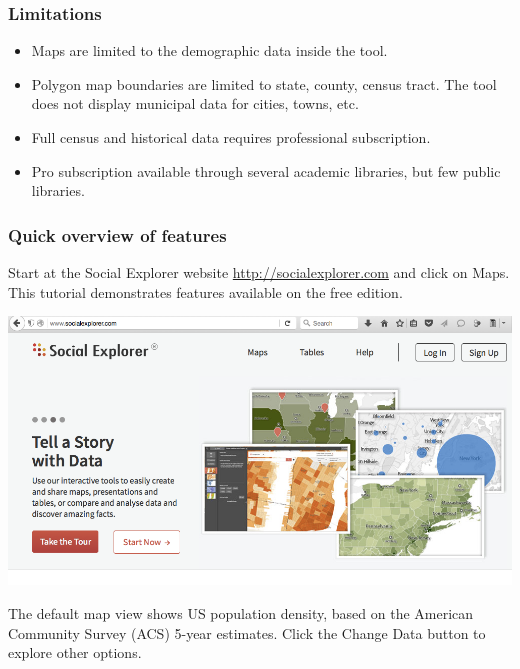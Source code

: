 \documentclass[
  english,
]{book}
\providecommand{\tightlist}{%
  \setlength{\itemsep}{0pt}\setlength{\parskip}{0pt}}
\begin{document}
\hypertarget{limitations}{%
\subsubsection*{Limitations}\label{limitations}}

\begin{itemize}
\tightlist
\item
  Maps are limited to the demographic data inside the tool.
\item
  Polygon map boundaries are limited to state, county, census tract. The tool does not display municipal data for cities, towns, etc.
\item
  Full census and historical data requires professional subscription.
\item
  Pro subscription available through several academic libraries, but few public libraries.
\end{itemize}

\hypertarget{quick-overview-of-features}{%
\subsubsection*{Quick overview of features}\label{quick-overview-of-features}}

Start at the Social Explorer website \url{http://socialexplorer.com} and click on Maps. This tutorial demonstrates features available on the free edition.

\includegraphics{images/06-map/SE-home.png}

The default map view shows US population density, based on the American Community Survey (ACS) 5-year estimates. Click the Change Data button to explore other options.
\end{document}
